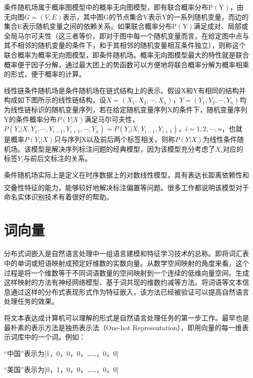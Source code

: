 \documentclass[winfonts,master,oneside,nobackinfo]{njuthesis}
\newcommand{\upcite}[1]{\textsuperscript{\textsuperscript{\cite{#1}}}}
\begin{document}
条件随机场属于概率图模型中的概率无向图模型，即有联合概率分布$\mathrm { P } (\mathrm { Y } )$，由无向图$G = ( V , E )$表示，其中图G的节点集合V表示Y的一系列随机变量，而边的集合E表示随机变量之间的依赖关系。如果联合概率分布$\mathrm { P } (\mathrm { Y } )$满足成对、局部或全局马尔可夫性（这三者等价，即对于图中每一个随机变量而言，在给定图中点与其不相邻的随机变量的条件下，和于其相邻的随机变量相互条件独立），则称这个联合概率为概率无向图模型，即条件随机场。概率无向图模型最大的特性就是联合概率便于因子分解，通过最大团上的势函数可以方便地将联合概率分解为概率相乘的形式，便于概率的计算。

线性链条件随机场是条件随机场在链式结构上的表示。假设X和Y有相同的结构并构成如下图所示的线性链结构，设$X = \left( X _ { 1 } , X _ { 2 } , \cdots , X _ { n } \right)$，$Y = \left( Y _ { 1 } , Y _ { 2 } , \cdots , Y _ { n } \right)$均为线性链标识的随机变量序列，若在给定随机变量序列X的条件下，随机变量序列Y的条件概率分布$P ( Y | X )$满足马尔可夫性，$P \left( Y _ { i } | X , Y _ { 1 } , \cdots , Y _ { i - 1 } , Y _ { i + 1 } , \cdots , Y _ { n } \right) = P \left( Y _ { i } | X , Y _ { i - 1 } , Y _ { i + 1 } \right)$，$i = 1,2 , \cdots , n$，也就是概率$P (Y_{i}|X)$只与序列X以及前后两个标签相关。则称$P ( Y | X )$为线性条件随机场。该模型是解决序列标注问题的经典模型，因为该模型充分考虑了$X _ { i }$对应的标签$Y _ { i }$与前后文标注的关系。



条件随机场实际上是定义在时序数据上的对数线性模型，具有表达长距离依赖性和交叠性特征的能力，能够较好地解决标注偏置等问题。很多工作\upcite{Settles}都说明该模型对于命名实体识别技术有着很好的帮助。

\section{词向量}
分布式词嵌入是自然语言处理中一组语言建模和特征学习技术的总称。即将词汇表中的单词或短语映射成预定好维数的实数向量。从数学空间映射的角度来看，这个过程是将一个维数等于不同词语数量的空间映射到一个连续的低维向量空间。生成这样映射的方法有神经网络模型、基于词共现的维数约减等方法。将词语等文本信息通过这样的分布式表现形式作为特征嵌入，该方法已经被验证可以提高自然语言处理任务的效果。

将文本表达成计算机可以理解的形式是自然语言处理任务的第一步工作。最早也是最朴素的表示方法是独热表示法（One-hot Representation），即用向量的每一维表示词库中的一个词。例如：

“中国”表示为[1，0，0，0，……，0，0]

“美国”表示为[0，1，0，0，……，0，0]
\end{document}
